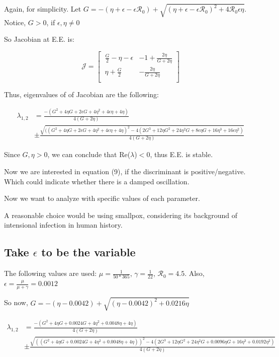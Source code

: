 \documentclass[12pt]{article}
\begin{document}
Again, for simplicity. Let $G=-(\eta+\epsilon-\epsilon\mathcal{R}_0)+\sqrt{(\eta+\epsilon-\epsilon\mathcal{R}_0)^2+4\mathcal{R}_0\epsilon \eta}$. Notice, $G>0$, if $\epsilon,\eta\neq 0$

So Jacobian at E.E. is:

\begin{equation}
\mathcal{J} =
\begin{bmatrix}
    \ \frac{G}{2}-\eta-\epsilon       & -1+\frac{2\eta}{G+2\eta} \\
    \ \eta+\frac{G}{2}       & -\frac{2\eta}{G+2\eta} \\
\end{bmatrix}
\end{equation}

Thus, eigenvalues of of Jacobian are the following:

\begin{align}
\lambda_{1,2} &= \frac{-(G^2+4\eta G+2\epsilon G+4\eta^2+4\epsilon\eta+4\eta) }{4(G+2\eta)}\\
& \pm \frac{\sqrt{((G^2+4\eta G+2\epsilon G+4\eta^2+4\epsilon\eta+4\eta)^2-4(2G^3+12\eta G^2+24\eta^2 G+8\epsilon\eta G+16\eta^3+16\epsilon\eta^2)}}{4(G+2\eta)}
\end{align}

Since $G,\eta >0$, we can conclude that Re($\lambda$)$<0$, thus E.E. is stable.

Now we are interested in equation (9), if the discriminant is positive/negative. Which could indicate whether there is a damped oscillation.

Now we want to analyze with specific values of each parameter.

A reasonable choice would be using smallpox, considering its background of intensional infection in human history.


\subsection{Take $\epsilon$ to be the variable}
The following values are used: $\mu=\frac{1}{50*365}$, $\gamma=\frac{1}{22}$, $\mathcal{R}_0=4.5$. Also, $\epsilon=\frac{\mu}{\mu+\gamma}=0.0012$

So now, $G=-(\eta-0.0042)+\sqrt{(\eta-0.0042)^2+0.0216\eta}$

\begin{align}
\lambda_{1,2} &= \frac{-(G^2+4\eta G+0.0024 G+4\eta^2+0.0048\eta+4\eta) }{4(G+2\eta)}\\
& \pm \frac{\sqrt{((G^2+4\eta G+0.0024 G+4\eta^2+0.0048\eta+4\eta))^2-4(2G^3+12\eta G^2+24\eta^2 G+0.0096\eta G+16\eta^3+0.0192\eta^2)}}{4(G+2\eta)}
\end{align}
\end{document}
